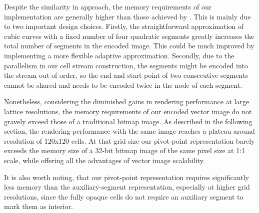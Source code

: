 \documentclass[11pt,a4paper,twoside]{article}
\begin{document}
Despite the similarity in approach, the memory requirements of our implementation are generally higher than those achieved by \cite{NehabHoppe08}. This is mainly due to two important design choices. Firstly, the straightforward approximation of cubic curves with a fixed number of four quadratic segments greatly increases the total number of segments in the encoded image. This could be much improved by implementing a more flexible adaptive approximation. Secondly, due to the parallelism in our cell stream construction, the segments might be encoded into the stream out of order, so the end and start point of two consecutive segments cannot be shared and needs to be encoded twice in the node of each segment.

Nonetheless, considering the diminished gains in rendering performance at large lattice resolutions, the memory requirements of our encoded vector image do not gravely exceed those of a traditional bitmap image. As described in the following section, the rendering performance with the same image reaches a plateau around resolution of 120x120 cells. At that grid size our pivot-point representation barely exceeds the memory size of a 32-bit bitmap image of the same pixel size at 1:1 scale, while offering all the advantages of vector image scalability.

It is also worth noting, that our pivot-point representation requires significantly less memory than the auxiliary-segment representation, especially at higher grid resolutions, since the fully opaque cells do not require an auxiliary segment to mark them as interior.
\end{document}
